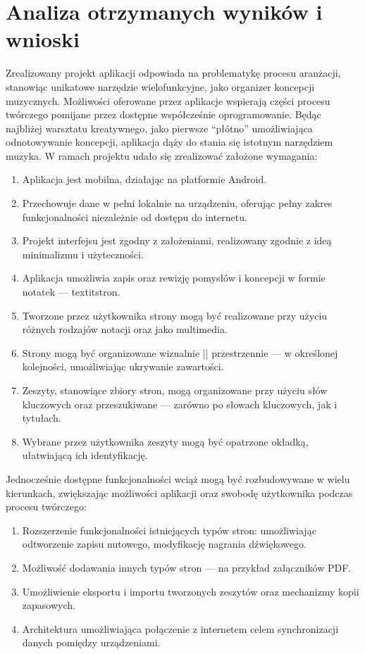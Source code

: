 \documentclass[12pt]{article}
\begin{document}
\section{Analiza otrzymanych wyników i wnioski}
Zrealizowany projekt aplikacji odpowiada na problematykę procesu aranżacji, stanowiąc unikatowe narzędzie wielofunkcyjne,
jako organizer koncepcji muzycznych. Możliwości oferowane przez aplikacje wspierają części procesu twórczego pomijane przez
dostępne współcześnie oprogramowanie. Będąc najbliżej warsztatu kreatywnego, jako pierwsze \enquote{płótno}
umożliwiająca odnotowywanie koncepcji, aplikacja dąży do stania się istotnym narzędziem muzyka.
W ramach projektu udało się zrealizować założone wymagania:
\begin{enumerate}
	\item Aplikacja jest mobilna, działając na platformie Android.
	\item Przechowuje dane w pełni lokalnie na urządzeniu, oferując pełny zakres funkcjonalności niezależnie od dostępu do internetu.
	\item Projekt interfejsu jest zgodny z założeniami, realizowany zgodnie z ideą minimalizmu i użyteczności.
	\item Aplikacja umożliwia zapis oraz rewizję pomysłów i koncepcji w formie notatek — textit{stron}.
	\item Tworzone przez użytkownika strony mogą być realizowane przy użyciu różnych rodzajów notacji oraz jako multimedia.
	\item Strony mogą być organizowane wizualnie || przestrzennie — w określonej kolejności, umożliwiając ukrywanie zawartości.
	\item Zeszyty, stanowiące zbiory stron, mogą organizowane przy użyciu słów kluczowych oraz przeszukiwane — zarówno po słowach kluczowych, jak i tytułach.
	\item Wybrane przez użytkownika zeszyty mogą być opatrzone okładką, ułatwiającą ich identyfikację.
\end{enumerate}

Jednocześnie dostępne funkcjonalności wciąż mogą być rozbudowywane w wielu kierunkach,
zwiększając możliwości aplikacji oraz swobodę użytkownika podczas procesu twórczego:
\begin{enumerate}
	\item Rozszerzenie funkcjonalności istniejących typów stron: umożliwiając odtworzenie zapisu nutowego, modyfikację nagrania dźwiękowego.
	\item Możliwość dodawania innych typów stron — na przykład załączników PDF.
	\item Umożliwienie eksportu i importu tworzonych zeszytów oraz mechanizmy kopii zapasowych.
	\item Architektura umożliwiająca połączenie z internetem celem synchronizacji danych pomiędzy urządzeniami.
\end{enumerate}
\end{document}
